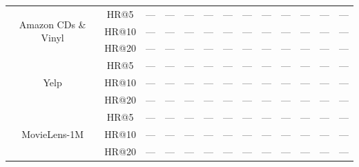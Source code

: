 \documentclass[master,english,final]{postech-ucs}
\begin{document}
\begin{table}[htbp]
{\begin{tabular}{cc|cccccccccc|c}
\midrule
\multirow{3}{*}{Amazon CDs \& Vinyl}
 & HR@5    & --- & --- & --- & --- & --- & --- & --- & --- & --- & --- & --- \\
 & HR@10   & --- & --- & --- & --- & --- & --- & --- & --- & --- & --- & --- \\
 & HR@20   & --- & --- & --- & --- & --- & --- & --- & --- & --- & --- & --- \\
\midrule
\multirow{3}{*}{Yelp}
 & HR@5    & --- & --- & --- & --- & --- & --- & --- & --- & --- & --- & --- \\
 & HR@10   & --- & --- & --- & --- & --- & --- & --- & --- & --- & --- & --- \\
 & HR@20   & --- & --- & --- & --- & --- & --- & --- & --- & --- & --- & --- \\
\midrule
\multirow{3}{*}{MovieLens-1M}
 & HR@5    & --- & --- & --- & --- & --- & --- & --- & --- & --- & --- & --- \\
 & HR@10   & --- & --- & --- & --- & --- & --- & --- & --- & --- & --- & --- \\
 & HR@20   & --- & --- & --- & --- & --- & --- & --- & --- & --- & --- & --- \\
\bottomrule
\end{tabular}
}
\end{table}
\end{document}
